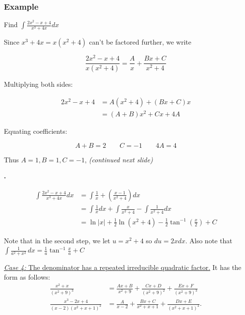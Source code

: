 \documentclass[t]{beamer}
\theoremstyle{plain}
\theoremstyle{definition}
\newcounter{heading}
\newcommand{\newhead}[1]{\medskip\stepcounter{heading}\noindent\textbf{\hspace{0.2cm}{#1}.}}
\begin{document}
\begin{frame}
\footnotesize
\frametitle{Example}
Find $\displaystyle\int\frac{2x^2 - x + 4}{x^3 + 4x}dx$

Since $x^3 + 4x = x(x^2 + 4)$ can't be factored further, we write

$$\frac{2x^2 - x + 4}{x(x^2 + 4)} = \frac{A}{x} + \frac{Bx + C}{x^2 + 4}$$

Multiplying both sides:

\begin{align*}
2x^2 - x + 4 &= A(x^2 + 4) + (Bx + C)x\\
&= (A + B)x^2 + Cx + 4A
\end{align*}

Equating coefficients:

$$A + B = 2 \qquad C = -1 \qquad 4A = 4$$

Thus $A = 1, B = 1, C = -1$,   \textit{(continued next slide)}

\end{frame}

\begin{frame}
\footnotesize
\newhead{Continued...}

\begin{align*}
\displaystyle\int\frac{2x^2 - x + 4}{x^3 + 4x}dx &= \int \frac{1}{x} + \left(\frac{x - 1}{x^2 + 4}\right)dx \\
&= \int\frac{1}{x}dx + \int\frac{x}{x^2 + 4} - \int\frac{1}{x^2 + 4}dx\\
&=\ln |x|+ \frac{1}{2}\ln(x^2 + 4) - \frac{1}{2}\tan^{-1}(\frac{x}{2}) + C
\end{align*}

Note that in the second step, we let $u = x^2 + 4$ so $du = 2xdx$.  Also note that $\int\frac{1}{a^2+x^2}\,dx=\frac{1}{a}\tan^{-1}\frac{x}{a}+C$

\end{frame}

\begin{frame}
\noindent\underline{\textit{Case 4:} The denominator has a repeated irreducible quadratic factor.}
It has the form as follows:
\begin{align*}
\frac{x^2+x}{(x^2+9)^3}&= {\frac{Ax+B}{x^2+9}+\frac{Cx+D}{(x^2+9)^2}+\frac{Ex+F}{(x^2+9)^3}}\\
\frac{x^3-2x+4}{(x-2)(x^2+x+1)^2}&= {\frac{A}{x-2}+\frac{Bx+C}{x^2+x+1}+\frac{Dx+E}{(x^2+x+1)^2}}.
\end{align*}
\end{frame}
\end{document}
